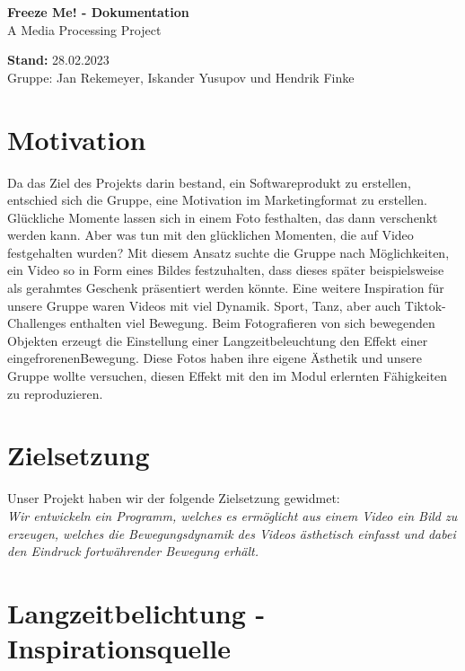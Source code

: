 \documentclass[12pt]{scrartcl}
\begin{document}
\hspace{-0.4cm}\huge \textbf{Freeze Me! - Dokumentation}\vspace{3pt}\\\Large A Media Processing Project \vspace{14pt}\large 

\noindent
\textbf{Stand:} 28.02.2023 \\

\vspace{3pt} \normalsize Gruppe: 
Jan Rekemeyer, Iskander Yusupov und Hendrik Finke

\section{Motivation}
Da das Ziel des Projekts darin bestand, ein Softwareprodukt zu erstellen, entschied sich die Gruppe, eine Motivation im Marketingformat zu erstellen.\\Gl\"uckliche Momente lassen sich in einem Foto festhalten, das dann verschenkt werden kann. Aber was tun mit den gl\"ucklichen Momenten, die auf Video festgehalten wurden? Mit diesem Ansatz suchte die Gruppe nach M\"oglichkeiten, ein Video so in Form eines Bildes festzuhalten, dass dieses sp\"ater beispielsweise als gerahmtes Geschenk pr\"asentiert werden k\"onnte.
Eine weitere Inspiration f\"ur unsere Gruppe waren Videos mit viel Dynamik. Sport, Tanz, aber auch Tiktok-Challenges enthalten viel Bewegung. Beim Fotografieren von sich bewegenden Objekten erzeugt die Einstellung einer Langzeitbeleuchtung den Effekt einer \glqq eingefrorenen\grqq  Bewegung. Diese Fotos haben ihre eigene \"Asthetik und unsere Gruppe wollte versuchen, diesen Effekt mit den im Modul erlernten F\"ahigkeiten zu reproduzieren.

\section{Zielsetzung}Unser Projekt haben wir der folgende Zielsetzung gewidmet: \\
\textit{Wir entwickeln ein Programm, welches es erm\"oglicht aus einem Video ein Bild zu erzeugen, welches die Bewegungsdynamik des Videos \"asthetisch einfasst und dabei den Eindruck fortw\"ahrender Bewegung erh\"alt.}

\section{Langzeitbelichtung - Inspirationsquelle} %
\end{document}
